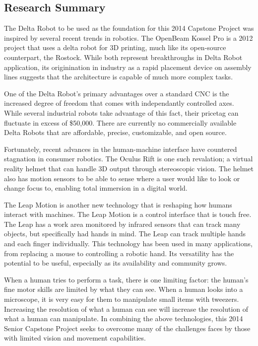 \documentclass[11pt]{report}
\begin{document}
\subsection{Research Summary}
\par The Delta Robot to be used as the foundation for this 2014 Capstone Project was inspired by several recent trends in robotics. The OpenBeam Kossel Pro is a 2012 project that uses a delta robot for 3D printing, much like its open-source counterpart, the Rostock. While both represent breakthroughs in Delta Robot application, its originination in industry as a rapid placement device on assembly lines suggests that the architecture is capable of much more complex tasks.

\par One of the Delta Robot's primary advantages over a standard CNC is the increased degree of freedom that comes with independantly controlled axes. While several industrial robots take advantage of this fact, their pricetag can fluctuate in excess of \$50,000. There are currently no commercially available Delta Robots that are affordable, precise, customizable, and open source.

\par Fortunately, recent advances in the human-machine interface have countered stagnation in consumer robotics. The Oculus Rift is one such revalation; a virtual reality helmet that can handle 3D output through stereoscopic vision. The helmet also has motion sensors to be able to sense where a user would like to look or change focus to, enabling total immersion in a digital world.

\par The Leap Motion is another new technology that is reshaping how humans interact with machines. The Leap Motion is a control interface that is touch free. The Leap has a work area monitored by infrared sensors that can track many objects, but specifically had hands in mind. The Leap can track multiple hands and each finger individually. This technology has been used in many applications, from replacing a mouse to controlling a robotic hand. Its versatility has the potential to be useful, especially as its availability and community grows.

\par When a human tries to perform a task, there is one limiting factor: the human's fine motor skills are limited by what they can see. When a human looks into a microscope, it is very easy for them to manipulate small items with tweezers. Increasing the resolution of what a human can see will increase the resolution of what a human can manipulate. In combining the above technologies, this 2014 Senior Capstone Project seeks to overcome many of the challenges faces by those with limited vision and movement capabilities.
\end{document}
